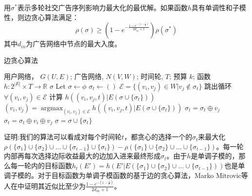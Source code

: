 \begin{theorem}
\label{thm:greedy}
用$\sigma^*$表示多轮社交广告序列影响力最大化的最优解。如果函数$h$具有单调性和子模性，则边贪心算法满足：
\begin{equation}
\rho(\sigma)\ge (1-e^{-\frac{1-e^{-(1-\frac{1}{k})}}{2d_{in}+1}})\rho(\sigma^*)
\end{equation}
\noindent 其中$d_{in}$为广告网络中节点的最大入度。
\end{theorem}
\begin{algorithm}[H]
    \renewcommand{\algorithmcfname}{算法}
    \caption{\label{alg:edge_greedy}边贪心算法} 
    \begin{algorithmic}[1]
    \REQUIRE 用户网络， \(G(U,E)\); 广告网络, \(N(V,W)\);
    时间轮, \(T\); 预算 \(k\);
    函数 \(h:2^{|E|} \times T \to \mathbb{R} \)
    \ENSURE \(\sigma\)
    \STATE Let \(\sigma \gets \phi \)
        \STATE \(\sigma_t \gets ( )\) \label{alg:greedy_line4}
            \STATE \(\mathcal{E} = \{(v_i,v_j) \in W | v_j \notin \sigma_t \}\)
                \STATE 跳出循环
            \ENDIF
            \STATE \(\forall (v_i,v_j) \in \mathcal{E}\) 计算 \(h((v_i,v_j,t)|E(\sigma \cup \{ \sigma_t\}))\) \label{alg:greedy_line3}
            \STATE \((v_i,v_j) = \mathop{\arg\max}_{(v_i,v_j) \in \mathcal{E}}h ((v_i,v_j,t)|E(\sigma \cup \{ \sigma_t\})) \)
                \STATE \(\sigma_t = \sigma_t \oplus v_j\) \label{alg:greedy_line1}
            \ELSE
                \STATE \(\sigma_t = \sigma_t \oplus v_i \oplus v_j\) \label{alg:greedy_line2}
            \ENDIF
        \ENDWHILE \label{alg:greedy_line5}
        \STATE \(\sigma = \sigma \cup \{\sigma_t\}\)
    \ENDFOR
    \end{algorithmic}
\end{algorithm}
\noindent 证明:我们的算法可以看成对每个时间轮$t$，都贪心的选择一个的$\sigma_t$来最大化$\rho(\{\sigma_1\}\cup \{\sigma_2\}\cup\ldots \cup \{\sigma_{t-1}\}\cup\{\sigma_t\})-\rho(\{\sigma_1\}\cup\{\sigma_2\}\cup\ldots \cup \{\sigma_{t-1}\})$。每一轮内部再每次选择边际收益最大的边加入进来最终形成$\sigma_t$。由于$h$是单调子模的，那么每一轮内的目标函数$h_t(E')=h(E'|E(\{\sigma_1\}\cup\{\sigma_2\}\cup\ldots \cup \{\sigma_{t-1}\}))$也是单调子模的。对于目标函数为单调子模函数的基于边的贪心算法，Marko Mitrovic等人在\parencite{mitrovic2018submodularity}中证明其近似比至少为$\frac{1-e^{-(1-\frac{1}{k})}}{2d_{in}+1}$。

